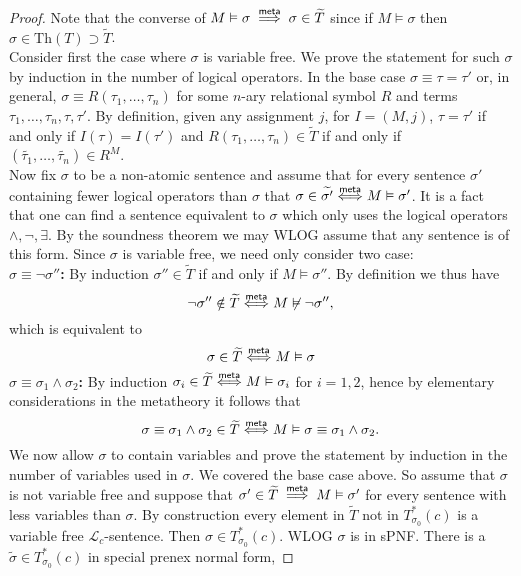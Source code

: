 \begin{proof}
    Note that the converse of $M\vDash \sigma \mathrel{\overset{\mathsf{meta}}{\implies}} \sigma\in \widetilde{T}$ since if $M\vDash \sigma$ then $\sigma\in \mathrm{Th}(T)\supset \widetilde{T}$.\\
    Consider first the case where $\sigma$ is variable free. We prove the statement for such $\sigma$ by induction in the number of logical operators. In the base case $\sigma\equiv \tau = \tau'$ or, in general, $\sigma \equiv R(\tau_1,\dots,\tau_n)$ for some $n$-ary relational symbol $R$ and terms $\tau_1,\dots,\tau_n,\tau,\tau'$. By definition, given any assignment $j$, for $I=(M,j)$, $\tau=\tau'$ if and only if $I(\tau)=I(\tau')$ and $R(\tau_1,\dots,\tau_n) \in \widetilde{T}$ if and only if $(\widetilde{\tau_1},\dots,\widetilde{\tau_n})\in R^M$.\\
    Now fix $\sigma$ to be a non-atomic sentence and assume that for every sentence $\sigma'$ containing fewer logical operators than $\sigma$ that $\sigma \in \widetilde{\sigma'}\mathrel{\overset{\mathsf{meta}}{\Longleftrightarrow}} M\vDash \sigma'$. It is a fact that one can find a sentence equivalent to $\sigma$ which only uses the logical operators $\wedge,\neg, \exists$. By the soundness theorem we may WLOG assume that any sentence is of this form. Since $\sigma$ is variable free, we need only consider two case:\\
    \textbf{$\sigma\equiv \neg\sigma''$:} By induction $\sigma''\in \widetilde{T}$ if and only if $M\vDash \sigma''$. By definition we thus have 
    $$
        \neg\sigma'' \notin\widetilde{T}\mathrel{\overset{\mathsf{meta}}{\Longleftrightarrow}} M\not\vDash \neg\sigma'', 
    $$ 
    which is equivalent to 
    $$
        \sigma \in \widetilde{T}\mathrel{\overset{\mathsf{meta}}{\Longleftrightarrow}} M\vDash \sigma 
    $$
    \textbf{$\sigma \equiv \sigma_1 \wedge \sigma_2$:} By induction $\sigma_i\in \widetilde{T} \mathrel{\overset{\mathsf{meta}}{\Longleftrightarrow}} M\vDash \sigma_i$ for $i=1,2$, hence by elementary considerations in the metatheory it follows that 
    $$
        \sigma\equiv\sigma_1 \wedge \sigma_2 \in \widetilde{T} \mathrel{\overset{\mathsf{meta}}{\Longleftrightarrow}} M\vDash \sigma\equiv\sigma_1\wedge \sigma_2.
    $$   
    We now allow $\sigma$ to contain variables and prove the statement by induction in the number of variables used in $\sigma$. We covered the base case above. So assume that $\sigma$ is not variable free and suppose that $\sigma'\in \widetilde{T} \mathrel{\overset{\mathsf{meta}}{\implies}} M\vDash\sigma'$ for every sentence with less variables than $\sigma$. By construction every element in $\widetilde{T}$ not in $T^\ast_{\sigma_0}(c)$ is a variable free $\mathcal{L}_c$-sentence. Then $\sigma\in T^\ast_{\sigma_0}(c)$. WLOG $\sigma$ is in sPNF. There is a $\widetilde{\sigma}\in T_{\sigma_0}^\ast(c)$ in special prenex normal form,

\end{proof}

